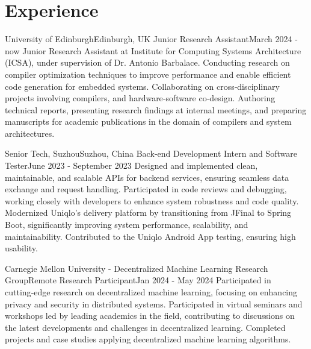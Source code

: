\section{Experience}
  \resumeSubHeadingListStart

    \resumeSubheading
      {University of Edinburgh}{Edinburgh, UK}
      {Junior Research Assistant}{March 2024 - now}
      \resumeItemListStart
          {Junior Research Assistant at Institute for Computing Systems Architecture (ICSA), under supervision of Dr. Antonio Barbalace.}
          {Conducting research on compiler optimization techniques to improve performance and enable efficient code generation for embedded systems.}
          {Collaborating on cross‑disciplinary projects involving compilers, and hardware‑software co‑design.}
          {Authoring technical reports, presenting research findings at internal meetings, and preparing manuscripts for academic publications in the domain of compilers and system architectures.}
      \resumeItemListEnd

    \resumeSubheading
      {Senior Tech, Suzhou}{Suzhou, China}
      {Back‑end Development Intern and Software Tester}{June 2023 - September 2023}
      \resumeItemListStart
          {Designed and implemented clean, maintainable, and scalable APIs for backend services, ensuring seamless data exchange and request handling.}
          {Participated in code reviews and debugging, working closely with developers to enhance system robustness and code quality.}
          {Modernized Uniqlo’s delivery platform by transitioning from JFinal to Spring Boot, significantly improving system performance, scalability, and maintainability.}
          {Contributed to the Uniqlo Android App testing, ensuring high usability.}
      \resumeItemListEnd

    \resumeSubheading
      {Carnegie Mellon University - Decentralized Machine Learning Research Group}{Remote}
      {Research Participant}{Jan 2024 - May 2024}
      \resumeItemListStart
          {Participated in cutting‑edge research on decentralized machine learning, focusing on enhancing privacy and security in distributed systems.}
          {Participated in virtual seminars and workshops led by leading academics in the field, contributing to discussions on the latest developments and challenges in decentralized learning.}
          {Completed projects and case studies applying decentralized machine learning algorithms.}
      \resumeItemListEnd

  \resumeSubHeadingListEnd